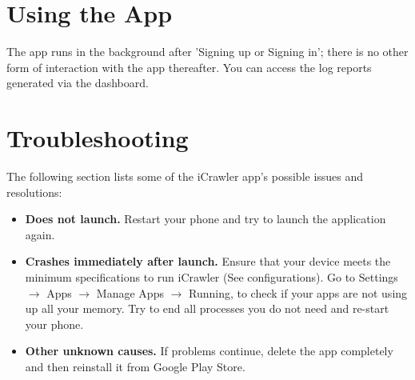 \documentclass[hidelinks, 12pt, oneside]{article}
\begin{document}
	 
	\section{Using the App}
	The app runs in the background after 'Signing up or Signing in'; there is no other form of interaction with 
	the app thereafter. You can access the log reports generated via the dashboard.
	\newline\newline
	
	\section{Troubleshooting}
	The following section lists some of the iCrawler app's possible issues and resolutions:
	
	\begin{itemize}
		\item \textbf{Does not launch.} Restart your phone and try to launch the application again.
		\item\textbf{Crashes immediately after launch.} Ensure that your device meets the minimum specifications to run
		 iCrawler (See configurations). Go to Settings $\rightarrow$ Apps $\rightarrow$ Manage Apps $\rightarrow$ Running, to check if your apps are not using up all
		  your memory. Try to end all processes you do not need and re-start your phone.
		\item \textbf{Other unknown causes.} If problems continue, delete the app completely and then reinstall it from Google Play Store.\
	\end{itemize}
		
\end{document}
